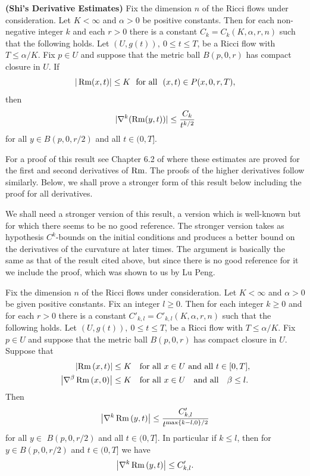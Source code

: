 \begin{theorem}\label{thm:shi-derivative-estimates}

\label{shi}

{\bf (Shi's Derivative Estimates)} Fix the dimension $n$ of the Ricci flows under consideration. Let
$K<\infty$ and $\alpha>0$ be positive constants.  Then for each
non-negative integer $k$ and each $r>0$ there is a constant
$C_k=C_k(K,\alpha,r,n)$ such that the following holds. Let
$(U,g(t)),\ 0\le t\le T$, be a Ricci flow with $T\le \alpha/K$.
Fix $p\in U$ and suppose that the metric ball $B(p,0,r)$ has compact
closure in $U$. If
$$|\operatorname{Rm}(x,t)|\le K\ \ \text{for all }\ (x,t)\in P(x,0,r,T),$$
then
$$|\nabla^k(\operatorname{Rm}(y,t))|\le \frac{C_k}{t^{k/2}}$$
for all $y\in B(p,0,r/2)$ and all $t\in(0,T]$.
\end{theorem}

For a proof of this result see Chapter 6.2 of \cite{ChowLuNi} where
these estimates are proved for the first and second derivatives of
$\operatorname{Rm}$. The proofs of the higher derivatives follow similarly.  Below, we
shall prove a stronger form of this result below including the proof
for all derivatives.

We shall need a stronger version of this result, a version which is
well-known but for which there seems to be no good reference. The
stronger version takes as hypothesis $C^k$-bounds on the
initial conditions and produces a better bound on the derivatives of
the curvature at later times. The argument is basically the same as
that of the result cited above, but since there is no good reference
for it we include the proof, which was shown to us by Lu Peng.





\begin{theorem}\label{thm:shi-with-initial-derivatives}

\label{shiw/deriv}

Fix the dimension $n$ of the Ricci flows under consideration. Let
$K<\infty$ and $\alpha>0$ be given positive constants. Fix an
integer $l\ge 0$. Then for each integer $k\ge 0$ and for each $r>0$
there is a constant $C'_{k,l}=C'_{k,l}(K,\alpha,r,n)$ such that the
following holds. Let $(U,g(t)),\ 0\le t\le T$, be a Ricci flow with
$T\le \alpha/K$. Fix $p\in U$ and suppose that the metric ball
$B(p,0,r)$ has compact closure in $U$. Suppose that
\begin{eqnarray*}
\left\vert \operatorname{Rm}\left(  x,t\right)  \right\vert  &
\leq K\ \ \text{ for all }x\in U\text{ and all}\  t\in[0,T],\\
\left\vert \nabla^{\beta}\operatorname{Rm}\left(  x,0\right)
\right\vert  & \leq K\ \ \text{ for all }x\in U\ \ \text{ and all }\
\ \beta\leq l.
\end{eqnarray*}
Then
\[
\left\vert \nabla^{k}\Rm\left(  y,t\right)
\right\vert
\leq\frac{C'_{k,l}}{t^{\max\left\{  k-l,0\right\}  /2}}%
\]
for all $y\in$ $B(p,0,r/2)  $ and all $t\in(0,T].$ In particular if
$k\leq l$, then for $y\in B(p,0,r/2)$ and $t\in (0,T]$ we have
\[
\left\vert \nabla^{k}\operatorname{Rm}\left(  y,t\right)
\right\vert \leq C_{k,l}'.
\]
\end{theorem}


